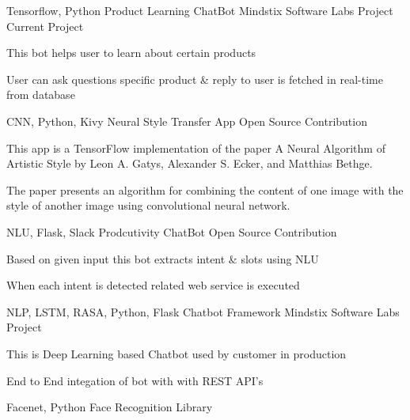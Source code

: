 \begin{cventries}
  \cventry
    {Tensorflow, Python} %
    {Product Learning ChatBot} %
    {Mindstix Software Labs Project} %
    {Current Project} %
    {
      \begin{cvitems} %
        \item {This bot helps user to learn about certain products}
        \item {User can ask questions specific product \& reply to user is fetched in real-time from database}
      \end{cvitems}
    }
  \cventry
    {CNN, Python, Kivy} %
    {Neural Style Transfer App} %
    {Open Source Contribution} %
    {} %
    {
      \begin{cvitems} %
        \item {This app is a TensorFlow implementation of the paper A Neural Algorithm of Artistic Style by Leon A. Gatys, Alexander S. Ecker, and Matthias Bethge.}
        \item {The paper presents an algorithm for combining the content of one image with the style of another image using convolutional neural network.}
      \end{cvitems}
    }
  \cventry
    {NLU, Flask, Slack} %
    {Prodcutivity ChatBot} %
    {Open Source Contribution} %
    {} %
    {
      \begin{cvitems} %
        \item {Based on given input this bot extracts intent \& slots using NLU}
        \item {When each intent is detected related web service is executed}
      \end{cvitems}
    }
  \cventry
    {NLP, LSTM, RASA, Python, Flask} %
    {Chatbot Framework} %
    {Mindstix Software Labs Project} %
    {} %
    {
      \begin{cvitems} %
        \item {This is Deep Learning based Chatbot used by customer in production}
        \item {End to End integation of bot with with REST API's }
      \end{cvitems}
    }
  \cventry
    {Facenet, Python} %
    {Face Recognition Library} %

\end{cventries}
